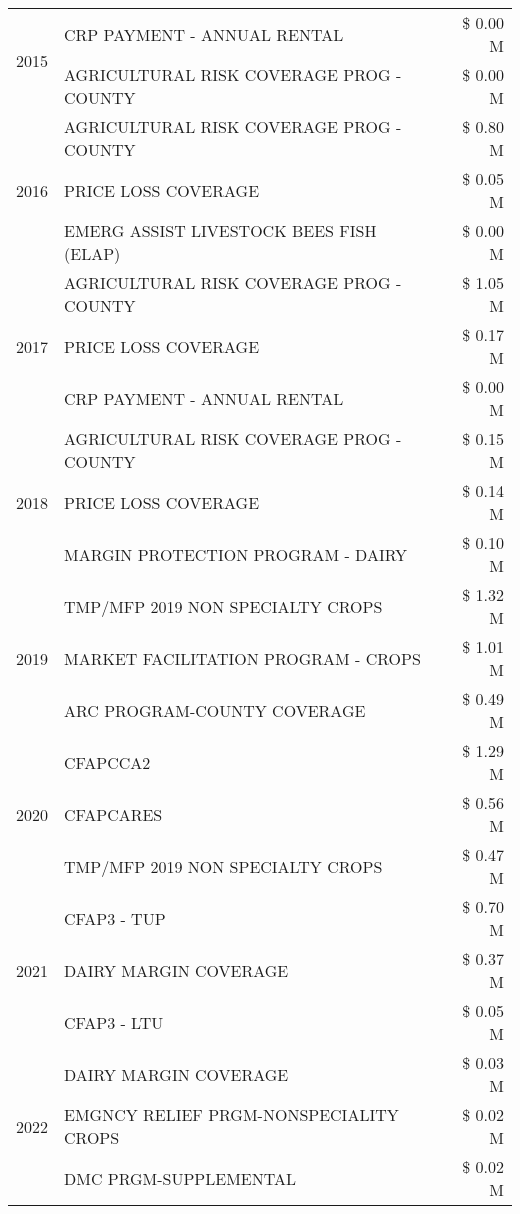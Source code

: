 \begin{tabular}{llr}
\multirow[t]{2}{*}{2015} & CRP PAYMENT - ANNUAL RENTAL & \$ 0.00 M \\
 & AGRICULTURAL RISK COVERAGE PROG - COUNTY & \$ 0.00 M \\
\cline{1-3}
\multirow[t]{3}{*}{2016} & AGRICULTURAL RISK COVERAGE PROG - COUNTY & \$ 0.80 M \\
 & PRICE LOSS COVERAGE & \$ 0.05 M \\
 & EMERG ASSIST LIVESTOCK BEES FISH (ELAP) & \$ 0.00 M \\
\cline{1-3}
\multirow[t]{3}{*}{2017} & AGRICULTURAL RISK COVERAGE PROG - COUNTY & \$ 1.05 M \\
 & PRICE LOSS COVERAGE & \$ 0.17 M \\
 & CRP PAYMENT - ANNUAL RENTAL & \$ 0.00 M \\
\cline{1-3}
\multirow[t]{3}{*}{2018} & AGRICULTURAL RISK COVERAGE PROG - COUNTY & \$ 0.15 M \\
 & PRICE LOSS COVERAGE & \$ 0.14 M \\
 & MARGIN PROTECTION PROGRAM - DAIRY & \$ 0.10 M \\
\cline{1-3}
\multirow[t]{3}{*}{2019} & TMP/MFP 2019 NON SPECIALTY CROPS & \$ 1.32 M \\
 & MARKET FACILITATION PROGRAM - CROPS & \$ 1.01 M \\
 & ARC PROGRAM-COUNTY COVERAGE & \$ 0.49 M \\
\cline{1-3}
\multirow[t]{3}{*}{2020} & CFAPCCA2 & \$ 1.29 M \\
 & CFAPCARES & \$ 0.56 M \\
 & TMP/MFP 2019 NON SPECIALTY CROPS & \$ 0.47 M \\
\cline{1-3}
\multirow[t]{3}{*}{2021} & CFAP3 - TUP & \$ 0.70 M \\
 & DAIRY MARGIN COVERAGE & \$ 0.37 M \\
 & CFAP3 - LTU & \$ 0.05 M \\
\cline{1-3}
\multirow[t]{3}{*}{2022} & DAIRY MARGIN COVERAGE & \$ 0.03 M \\
 & EMGNCY RELIEF PRGM-NONSPECIALITY CROPS & \$ 0.02 M \\
 & DMC PRGM-SUPPLEMENTAL & \$ 0.02 M \\
\cline{1-3}
\bottomrule
\end{tabular}
